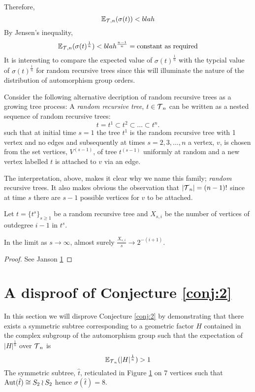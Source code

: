Therefore,
\[
 \mathbb{E}_{\operatorname{\mathcal{T}},n}(\sigma(t)) < blah 
\]
By Jensen's inequality,  %
\[
 \mathbb{E}_{\operatorname{\mathcal{T}},n}(\sigma(t)^{\frac{1}{n}}) < blah^{\frac{n-1}{n}} = \text{constant as required}
\]
It is interesting to compare the expected value of $\sigma(t)^{\frac{1}{n}}$ with the typcial value of $\sigma(t)^{\frac{1}{n}}$ 
for random recursive trees since this will illuminate the nature of the distribution of automorphism group orders.  
 
Consider the following alternative decription of random recursive trees as a growing tree process:  A \emph{random recursive 
tree}, $ t \in \operatorname{\mathcal{T}}_n$ can be written as a nested sequence of random recursive trees:
\[t = t^1 \subset t^2 \subset \dots \subset t^n.\]
such that at initial time $s=1$ the tree $t^1$ is the random recursive tree with 1 vertex and no edges and subsequently at times 
$s = 2,3,\dots,n$ a vertex, $v$, is chosen from the set vertices, $V^{(s-1)}$, of tree $t^{(s-1)}$ uniformly at random and a 
new vertex labelled $t$ is attached to $v$ via an edge.  
\begin{remk}
 The interpretation, above, makes it clear why we name this family; \emph{random} recursive trees.  It also makes obvious the 
 observation that $\lvert \operatorname{\mathcal{T}}_n \rvert  = (n-1)!$ since at time $s$ there are $s-1$ possible vertices for $v$ to be attached.  
\end{remk}
Let $t = \{t^s\}_{s\geq 1}$ be a random recursive tree and $X_{s,i}$ be the number of vertices of outdegree $i-1$ in $t^s$.
 
\begin{thm}
 In the limit as $s \rightarrow \infty$, almost surely $\frac{X_{s,i}}{s} \rightarrow 2^{-(i+1)}$. 
\end{thm}
\begin{proof}
 See Janson \ref{}
\end{proof}
\section{A disproof of Conjecture \ref{conj:2}}

In this section we will disprove Conjecture \ref{conj:2} by demonstrating that there exists a symmetric subtree corresponding to a geometric factor $H$  contained in the complex subgroup of the automorphism group such that the expectation of $\lvert H \rvert^{\frac{1}{n}}$ over $\operatorname{\mathcal{T}}_n$ is
  \[
   \mathbb{E}_{\operatorname{\mathcal{T}}_n}(\lvert H \rvert^{\frac{1}{n}}) >1
  \]
The symmetric subtree, $\hat{t}$, reticulated in Figure \ref{} on 7 vertices such that $\operatorname{Aut}(\hat{t}) \cong S_2 \wr S_2$ hence $\sigma(\hat{t}) = 8$.

